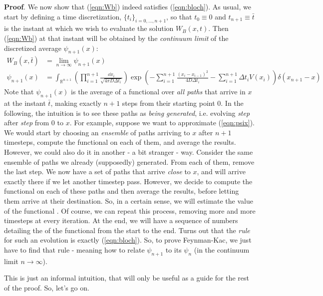 \documentclass[../template.tex]{subfiles}
\begin{document}
\textbf{Proof}. We now show that (\ref{eqn:Wb}) indeed satisfies (\ref{eqn:bloch}). As usual, we start by defining a time discretization, $\{t_i\}_{i=0,\dots,n+1}$, so that $t_0 \equiv 0$ and $t_{n+1} \equiv \bar{t}$ is the instant at which we wish to evaluate the solution $W_B(x,t)$. Then (\ref{eqn:Wb}) at that instant will be obtained by the \textit{continuum limit} of the discretized average $\psi_{n+1}(x)$:
\begin{align}
    W_B(x, \bar{t}) &= \lim_{n \to \infty} \psi_{n+1}(x) \nonumber\\
    \psi_{n+1}(x) &= \int_{\mathbb{R}^{n+1}} \left(\prod_{i=1}^{n+1} \frac{\dd{x_i}}{\sqrt{4 \pi D \Delta t_i} }\right) \exp\left(-\sum_{i=1}^{n+1} \frac{(x_i - x_{i-1})^2}{4 D \Delta t_i} - \sum_{i=1}^{n+1} \Delta t_i V(x_i)\right) \delta(x_{n+1}-x)
     \label{eqn:psix}
\end{align} 
Note that $\psi_{n+1}(x)$ is the average of a functional over \textit{all paths} that arrive in $x$ at the instant $\bar{t}$, making exactly $n+1$ steps from their starting point $0$. In the following, the intuition is to see these paths as \textit{being generated}, i.e. evolving \textit{step} after \textit{step} from $0$ to $x$. For example, suppose we want to approximate (\ref{eqn:psix}). We would start by choosing an \textit{ensemble} of paths arriving to $x$ after $n+1$ timesteps, compute the functional on each of them, and average the results.
However, we could also do it in another  - a bit stranger - way. Consider the same ensemble of paths we already (supposedly) generated. From each of them, remove the last step. We now have a set of paths that arrive \textit{close} to $x$, and will arrive exactly there if we let another timestep pass. However, we decide to compute the functional on each of these paths and then average the results, before letting them arrive at their destination. So, in a certain sense, we will estimate the value of the functional . Of course, we can repeat this process, removing more and more timesteps at every iteration. At the end, we will have a sequence of numbers detailing the  of the functional from the start to the end. Turns out that the \textit{rule} for such an evolution is exactly (\ref{eqn:bloch}). So, to prove Feynman-Kac, we just have to find that rule - meaning how to relate $\psi_{n+1}$ to its  $\psi_n$ (in the continuum limit $n \to\infty$).

This is just an informal intuition, that will only be useful as a guide for the rest of the proof. So, let's go on.
\end{document}
